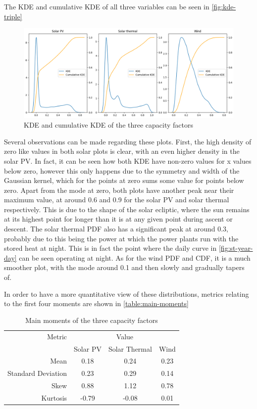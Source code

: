 The KDE and cumulative KDE of all three variables can be seen in \autoref{fig:kde-triple}

\begin{figure}[ht]
    \centering
    \captionsetup{justification=centering}
    \includegraphics[width=\linewidth]{assets/kde-triple.png}
    \caption{KDE and cumulative KDE of the three capacity factors}
    \label{fig:kde-triple}
\end{figure}

Several observations can be made regarding these plots. First, the high density of zero like values in both solar plots is clear, with an even higher density in the solar PV. In fact, it can be seen how both KDE have non-zero values for x values below zero, however this only happens due to the symmetry and width of the Gaussian kernel, which for the points at zero sums some value for points below zero. Apart from the mode at zero, both plots have another peak near their maximum value, at around 0.6 and 0.9 for the solar PV and solar thermal respectively. This is due to the shape of the solar ecliptic, where the sun remains at its highest point for longer than it is at any given point during ascent or descent. The solar thermal PDF also has a significant peak at around 0.3, probably due to this being the power at which the power plants run with the stored heat at night. This is in fact the point where the daily curve in \autoref{fig:st-year-day} can be seen operating at night. As for the wind PDF and CDF, it is a much smoother plot, with the mode around 0.1 and then slowly and gradually tapers of. 

In order to have a more quantitative view of these distributions, metrics relating to the first four moments are shown in \autoref{table:main-moments}

\begin{table}[ht]
    \centering
    \begin{tabular}{rccc}
        \toprule
        Metric & \multicolumn{3}{c}{Value} \\ 
        \cmidrule(lr){2-4}
            & Solar PV & Solar Thermal & Wind \\
        \midrule
        Mean & 0.18 & 0.24 & 0.23 \\
        Standard Deviation & 0.23 & 0.29 & 0.14 \\
        Skew & 0.88 & 1.12 & 0.78 \\
        Kurtosis & -0.79 & -0.08 & 0.01 \\
        \bottomrule
    \end{tabular}
    \caption{Main moments of the three capacity factors}
    \label{table:main-moments}
\end{table}

